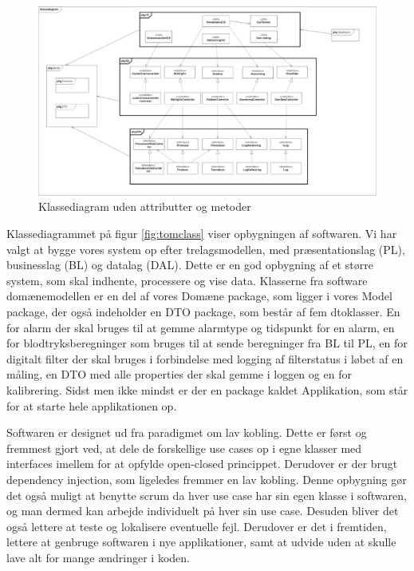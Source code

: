 \begin{figure}[h!]
	\centering
	\includegraphics[width=1\linewidth]{Arkitektur_og_design/Softwarearkitektur/tomclass}
	\caption{Klassediagram uden attributter og metoder}
	\label{fig:tomclass}
\end{figure}

Klassediagrammet på figur \vref{fig:tomclass} viser opbygningen af softwaren. Vi har valgt at bygge vores system op efter trelagsmodellen, med præsentationslag (PL), businesslag (BL) og datalag (DAL). Dette er en god opbygning af et større system, som skal indhente, processere og vise data. Klasserne fra software domænemodellen er en del af vores Domæne package, som ligger i vores Model package, der også indeholder en DTO package, som består af fem dtoklasser. En for alarm der skal bruges til at gemme alarmtype og tidspunkt for en alarm, en for blodtryksberegninger som bruges til at sende beregninger fra BL til PL, en for digitalt filter der skal bruges i forbindelse med logging af filterstatus i løbet af en måling, en DTO med alle properties der skal gemme i loggen og en for kalibrering. Sidst men ikke mindst er der en package kaldet Applikation, som står for at starte hele applikationen op. 

Softwaren er designet ud fra paradigmet om lav kobling. Dette er først og fremmest gjort ved, at dele de forskellige use cases op i egne klasser med interfaces imellem for at opfylde open-closed princippet. Derudover er der brugt dependency injection, som ligeledes fremmer en lav kobling. Denne opbygning gør det også muligt at benytte scrum  da hver use case har sin egen klasse i softwaren, og man dermed kan arbejde individuelt på hver sin use case. Desuden bliver det også lettere at teste og lokalisere eventuelle fejl. Derudover er det i fremtiden, lettere at genbruge softwaren i nye applikationer, samt at udvide uden at skulle lave alt for mange ændringer i koden. 

